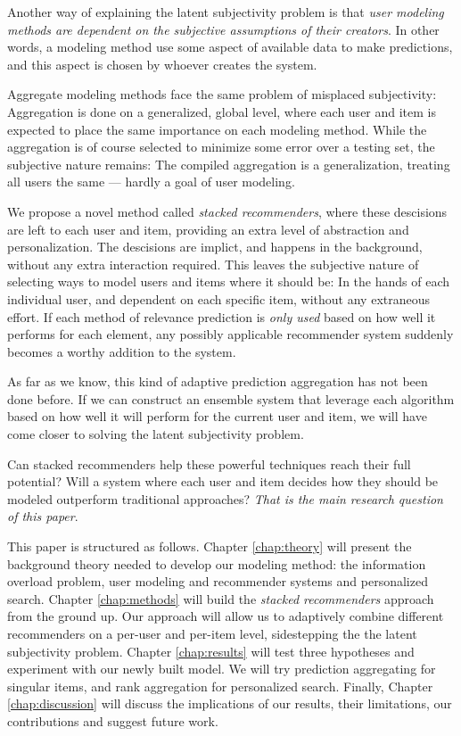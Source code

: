 Another way of explaining the latent subjectivity problem is that 
\emph{user modeling methods are dependent on the subjective assumptions of their creators}.
In other words, a modeling method use some aspect of available data to make predictions,
and this aspect is chosen by whoever creates the system.

Aggregate modeling methods face the same problem of misplaced subjectivity: 
Aggregation is done on a generalized, global level,
where each user and item is expected to place the same importance on each modeling method.
While the aggregation is of course selected to minimize some error over a testing set,
the subjective nature remains: The compiled aggregation is a generalization,
treating all users the same --- hardly a goal of user modeling.

We propose a novel method called \emph{stacked recommenders}, where these descisions are left to each user and item,
providing an extra level of abstraction and personalization.
The descisions are implict, and happens in the background, without any extra interaction required.
This leaves the subjective nature of selecting ways to model users and items where it should be:
In the hands of each individual user, and dependent on each specific item, without any extraneous effort.
If each method of relevance prediction is \emph{only used} based on how well it performs for each element,
any possibly applicable recommender system suddenly becomes a worthy addition to the system.

As far as we know, this kind of adaptive prediction aggregation has not been done before.
If we can construct an ensemble system that leverage each algorithm
based on how well it will perform for the current user and item,
we will have come closer to solving the latent subjectivity problem.

Can stacked recommenders help these powerful techniques reach their full potential?
Will a system where each user and item decides how they should be modeled outperform traditional approaches?
\emph{That is the main research question of this paper}.




This paper is structured as follows.
Chapter \ref{chap:theory} will present the background theory needed to develop our modeling method:
the information overload problem, user modeling and recommender systems and personalized search. 
Chapter \ref{chap:methods} will build the \emph{stacked recommenders} approach from the ground up.
Our approach will allow us to adaptively combine different recommenders
on a per-user and per-item level, sidestepping the the latent subjectivity problem.
Chapter \ref{chap:results} will test three hypotheses and experiment with our newly built model.
We will try prediction aggregating for singular items, and rank aggregation for personalized search.
Finally, Chapter \ref{chap:discussion} will discuss the implications of our results,
their limitations, our contributions and suggest future work.


